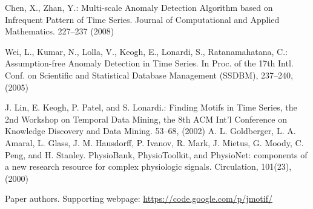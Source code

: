 \documentclass{llncs}
\begin{document}
\begin{thebibliography}{4}
 Chen, X., Zhan, Y.:
Multi-scale Anomaly Detection Algorithm based on Infrequent Pattern of Time Series.
Journal of Computational and Applied Mathematics. 227--237 (2008)

 Wei, L., Kumar, N., Lolla, V., Keogh, E., Lonardi, S., Ratanamahatana, C.:
Assumption-free Anomaly Detection in Time Series.
In Proc. of the 17th Intl. Conf. on Scientific and Statistical Database Management (SSDBM), 237--240, (2005)

J. Lin, E. Keogh, P. Patel, and S. Lonardi.: 
Finding Motifs in Time Series, the 2nd Workshop on Temporal Data Mining, the 8th ACM Int'l Conference on Knowledge Discovery and Data Mining. 53--68, (2002)
\enlargethispage{\baselineskip}
A. L. Goldberger, L. A. Amaral, L. Glass, J. M. Hausdorff, P. Ivanov, R. Mark, J.  Mietus, G. Moody, C. Peng, and H. Stanley. 
PhysioBank, PhysioToolkit, and PhysioNet: components of a new research resource for complex physiologic signals. 
Circulation, 101(23), (2000)

Paper authors. Supporting webpage:
\url{https://code.google.com/p/jmotif/}

\end{thebibliography}

% 
% 
% 
% 
% 
\end{document}

